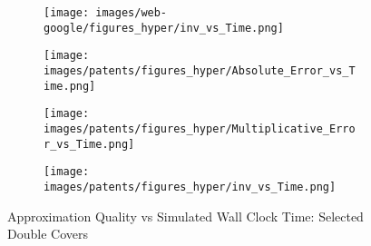 \begin{figure*}[htbp]
\begin{subfigure}[b]{\textwidth}
\begin{minipage}[b]{0.3\textwidth}
			\texttt{[image: images/web-google/figures\_hyper/inv\_vs\_Time.png]} %
		\end{minipage}
	\end{subfigure}
	\begin{subfigure}[b]{\textwidth}
		\centering
		\begin{minipage}[b]{0.05\textwidth}
			\centering
		\end{minipage}%
		\begin{minipage}[b]{0.3\textwidth}
			\centering
			\texttt{[image: images/patents/figures\_hyper/Absolute\_Error\_vs\_Time.png]} %
			
		\end{minipage}%
		\begin{minipage}[b]{0.3\textwidth}
			\centering
			\texttt{[image: images/patents/figures\_hyper/Multiplicative\_Error\_vs\_Time.png]} %
			
		\end{minipage}%
		\begin{minipage}[b]{0.3\textwidth}
			\centering
			\texttt{[image: images/patents/figures\_hyper/inv\_vs\_Time.png]} %
		\end{minipage}
	\end{subfigure}
	\caption{Approximation Quality vs Simulated Wall Clock Time: Selected Double Covers}
	\label{fig:errors_hyper_time}
\end{figure*}